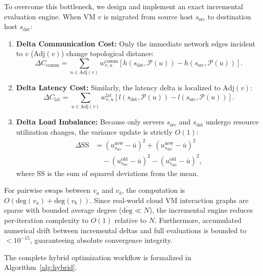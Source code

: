 \documentclass[conference]{IEEEtran}
\begin{document}
To overcome this bottleneck, we design and implement an exact incremental evaluation engine. When VM $v$ is migrated from source host $s_{\mathrm{src}}$ to destination host $s_{\mathrm{dst}}$:
\begin{enumerate}
    \item \textbf{Delta Communication Cost:} Only the immediate network edges incident to $v$ ($\mathrm{Adj}(v)$) change topological distance:
    \begin{equation}
    \Delta C_{\mathrm{comm}} = \sum_{u \in \mathrm{Adj}(v)} w_{v,u}^{\mathrm{comm}} \left[ h\left(s_{\mathrm{dst}}, \mathcal{P}(u)\right) - h\left(s_{\mathrm{src}}, \mathcal{P}(u)\right) \right].
    \end{equation}
    \item \textbf{Delta Latency Cost:} Similarly, the latency delta is localized to $\mathrm{Adj}(v)$:
    \begin{equation}
    \Delta C_{\mathrm{lat}} = \sum_{u \in \mathrm{Adj}(v)} w_{v,u}^{\mathrm{lat}} \left[ l\left(s_{\mathrm{dst}}, \mathcal{P}(u)\right) - l\left(s_{\mathrm{src}}, \mathcal{P}(u)\right) \right].
    \end{equation}
    \item \textbf{Delta Load Imbalance:} Because only servers $s_{\mathrm{src}}$ and $s_{\mathrm{dst}}$ undergo resource utilization changes, the variance update is strictly $O(1)$:
    \begin{align}
    \Delta \mathrm{SS} &= \left(u_{s_{\mathrm{src}}}^{\mathrm{new}} - \bar{u}\right)^2 + \left(u_{s_{\mathrm{dst}}}^{\mathrm{new}} - \bar{u}\right)^2 \nonumber \\
    &\quad - \left(u_{s_{\mathrm{src}}}^{\mathrm{old}} - \bar{u}\right)^2 - \left(u_{s_{\mathrm{dst}}}^{\mathrm{old}} - \bar{u}\right)^2,
    \end{align}
    where $\mathrm{SS}$ is the sum of squared deviations from the mean.
\end{enumerate}
For pairwise swaps between $v_a$ and $v_b$, the computation is $O(\mathrm{deg}(v_a) + \mathrm{deg}(v_b))$. Since real-world cloud VM interaction graphs are sparse with bounded average degree ($\overline{\mathrm{deg}} \ll N$), the incremental engine reduces per-iteration complexity to $O(1)$ relative to $N$. Furthermore, accumulated numerical drift between incremental deltas and full evaluations is bounded to $< 10^{-15}$, guaranteeing absolute convergence integrity.

The complete hybrid optimization workflow is formalized in Algorithm~\ref{alg:hybrid}.
\end{document}
